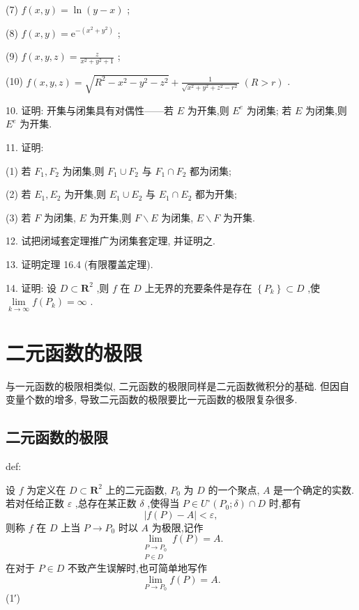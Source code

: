 (7) \(f\left( {x,y}\right)  = \ln \left( {y - x}\right)\) ;

(8) \(f\left( {x,y}\right)  = {\mathrm{e}}^{-\left( {{x}^{2} + {y}^{2}}\right) }\) ;

(9) \(f\left( {x,y,z}\right)  = \frac{z}{{x}^{2} + {y}^{2} + 1}\) ;

(10) \(f\left( {x,y,z}\right)  = \sqrt{{R}^{2} - {x}^{2} - {y}^{2} - {z}^{2}} + \frac{1}{\sqrt{{x}^{2} + {y}^{2} + {z}^{2} - {r}^{2}}}\;\left( {R > r}\right)\) .

10. 证明: 开集与闭集具有对偶性——若 \(E\) 为开集,则 \({E}^{e}\) 为闭集; 若 \(E\) 为闭集,则 \({E}^{e}\) 为开集.

11. 证明:

(1) 若 \({F}_{1},{F}_{2}\) 为闭集,则 \({F}_{1} \cup  {F}_{2}\) 与 \({F}_{1} \cap  {F}_{2}\) 都为闭集;

(2) 若 \({E}_{1},{E}_{2}\) 为开集,则 \({E}_{1} \cup  {E}_{2}\) 与 \({E}_{1} \cap  {E}_{2}\) 都为开集;

(3) 若 \(F\) 为闭集, \(E\) 为开集,则 \(F \smallsetminus  E\) 为闭集, \(E \smallsetminus  F\) 为开集.

12. 试把闭域套定理推广为闭集套定理, 并证明之.

13. 证明定理 16.4 (有限覆盖定理).

14. 证明: 设 \(D \subset  {\mathbf{R}}^{2}\) ,则 \(f\) 在 \(D\) 上无界的充要条件是存在 \(\left\{  {P}_{k}\right\}   \subset  D\) ,使 \(\mathop{\lim }\limits_{{k \rightarrow  \infty }}f\left( {P}_{k}\right)  = \infty\) .

\section{二元函数的极限}

与一元函数的极限相类似, 二元函数的极限同样是二元函数微积分的基础. 但因自变量个数的增多, 导致二元函数的极限要比一元函数的极限复杂很多.

\subsection{二元函数的极限}

\begin{definition}{}{def:}

\end{definition}
设 \(f\) 为定义在 \(D \subset  {\mathbf{R}}^{2}\) 上的二元函数, \({P}_{0}\) 为 \(D\) 的一个聚点, \(A\) 是一个确定的实数. 若对任给正数 \(\varepsilon\) ,总存在某正数 \(\delta\) ,使得当 \(P \in  {U}^{ \circ  }\left( {{P}_{0};\delta }\right)  \cap  D\) 时,都有
\[
\left| {f\left( P\right)  - A}\right|  < \varepsilon ,
\]
则称 \(f\) 在 \(D\) 上当 \(P \rightarrow  {P}_{0}\) 时以 \(A\) 为极限,记作
\[
\mathop{\lim }\limits_{\substack{{P \rightarrow  {P}_{0}} \\  {P \in  D} }}f\left( P\right)  = A. \tag{1}
\]
在对于 \(P \in  D\) 不致产生误解时,也可简单地写作
\[
\mathop{\lim }\limits_{{P \rightarrow  {P}_{0}}}f\left( P\right)  = A.
\]
 (1′)

